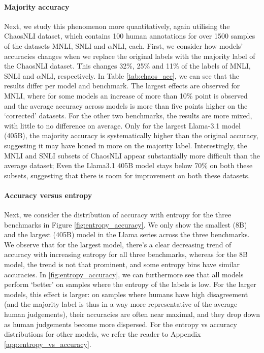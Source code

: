 \paragraph{Majority accuracy} 
Next, we study this phenomenon more quantitatively, again utilising the ChaosNLI dataset, which contains 100 human annotations for over 1500 samples of the datasets MNLI, SNLI and $\alpha$NLI, each.
First, we consider how models' accuracies changes when we replace the original labels with the majority label of the ChaosNLI dataset.
This changes 32\%, 25\% and 11\% of the labels of MNLI, SNLI and $\alpha$NLI, respectively.
In Table \ref{tab:chaos_acc}, we can see that the results differ per model and benchmark.
The largest effects are observed for MNLI, where for some models an increase of more than 10\% point is observed and the average accuracy across models is more than five points higher on the `corrected' datasets.
For the other two benchmarks, the results are more mixed, with little to no difference on average.
Only for the largest Llama-3.1 model (405B), the majority accuracy is systematically higher than the original accuracy, suggesting it may have honed in more on the majority label.
Interestingly, the MNLI and SNLI subsets of ChaosNLI appear substantially more difficult than the average dataset;
Even the Llama3.1 405B model stays below 70\% on both these subsets, suggesting that there is room for improvement on both these datasets.

\paragraph{Accuracy versus entropy}
Next, we consider the distribution of accuracy with entropy for the three benchmarks in Figure \ref{fig:entropy_accuracy}. 
We only show the smallest (8B) and the largest (405B) model in the Llama series across the three benchmarks. 
We observe that for the largest model, there's a clear decreasing trend of accuracy with increasing entropy for all three benchmarks, whereas for the 8B model, the trend is not that prominent, and some entropy bins have similar accuracies. 
In \cref{fig:entropy_accuracy}, we can furthermore see that all models perform `better' on samples where the entropy of the labels is low.
For the larger models, this effect is larger: on samples where humans have high disagreement (and the majority label is thus in a way more representative of the average human judgements), their accuracies are often near maximal, and they drop down as human judgements become more dispersed.
For the entropy vs accuracy distributions for other models, we refer the reader to Appendix \ref{app:entropy_vs_accuracy}.

